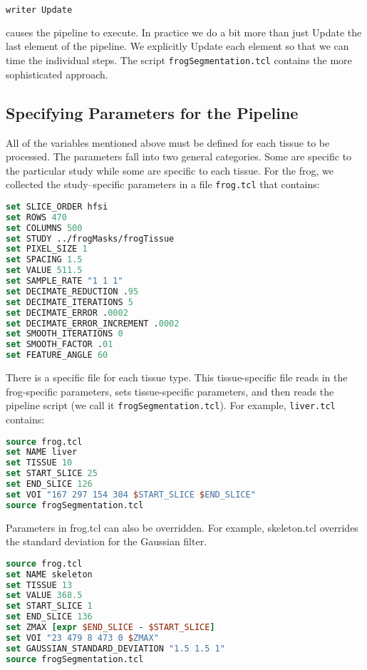 \begin{lstlisting}[language=TCL, caption={}]
writer Update
\end{lstlisting}

causes the pipeline to execute. In practice we do a bit more than just Update the last element of the pipeline. We explicitly Update each element so that we can time the individual steps. The script \texttt{frogSegmentation.tcl} contains the more sophisticated approach.

\subsection{Specifying Parameters for the Pipeline}

All of the variables mentioned above must be defined for each tissue
to be processed. The parameters fall into two general categories. Some are specific to the particular study while some are specific to each tissue. For the frog, we collected the study--specific parameters in a file \texttt{frog.tcl} that contains:

\begin{lstlisting}[language=TCL, caption={Specifying Parameters for the Pipeline.}]
set SLICE_ORDER hfsi
set ROWS 470
set COLUMNS 500
set STUDY ../frogMasks/frogTissue
set PIXEL_SIZE 1
set SPACING 1.5
set VALUE 511.5
set SAMPLE_RATE "1 1 1"
set DECIMATE_REDUCTION .95
set DECIMATE_ITERATIONS 5
set DECIMATE_ERROR .0002
set DECIMATE_ERROR_INCREMENT .0002
set SMOOTH_ITERATIONS 0
set SMOOTH_FACTOR .01
set FEATURE_ANGLE 60
\end{lstlisting}

There is a specific file for each tissue type. This tissue-specific file reads in the frog-specific parameters, sets tissue-specific parameters, and then reads the pipeline script (we call it  \texttt{frogSegmentation.tcl}). For example, \texttt{liver.tcl} contains:

\begin{lstlisting}[language=TCL, caption={Tissue specific file.}]
source frog.tcl
set NAME liver
set TISSUE 10
set START_SLICE 25
set END_SLICE 126
set VOI "167 297 154 304 $START_SLICE $END_SLICE"
source frogSegmentation.tcl
\end{lstlisting}

Parameters in frog.tcl can also be overridden. For example, skeleton.tcl overrides the standard deviation for the Gaussian filter.

\begin{lstlisting}[language=TCL, caption={Overriding parameters.}]
source frog.tcl
set NAME skeleton
set TISSUE 13
set VALUE 368.5
set START_SLICE 1
set END_SLICE 136
set ZMAX [expr $END_SLICE - $START_SLICE]
set VOI "23 479 8 473 0 $ZMAX"
set GAUSSIAN_STANDARD_DEVIATION "1.5 1.5 1"
source frogSegmentation.tcl
\end{lstlisting}

